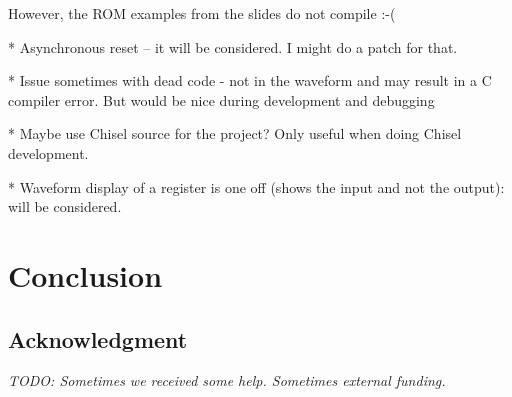 \documentclass[a4paper, conference]{IEEEtran}
\newcommand{\todo}[1]{{\emph{TODO: #1}}}
\begin{document}
However, the ROM examples from the slides do not compile :-(

* Asynchronous reset -- it will be considered. I might do a patch for that.

* Issue sometimes with dead code - not in the waveform and may
result in a C compiler error. But would be nice during development and debugging

* Maybe use Chisel source for the project? Only useful when doing Chisel development.

* Waveform display of a register is one off (shows the input and not the output):
will be considered.

\section{Conclusion}
\label{sec:conclusion}


\subsection*{Acknowledgment}

\todo{Sometimes we received some help. Sometimes external funding.}




%


\end{document}
